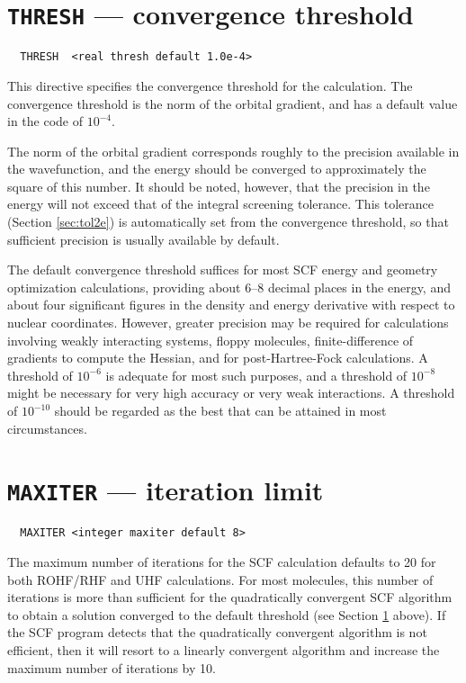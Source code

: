 \section{{\tt THRESH} --- convergence threshold}
\label{sec:thresh}

\begin{verbatim}
  THRESH  <real thresh default 1.0e-4>
\end{verbatim}

This directive specifies the convergence threshold for the
calculation.  The convergence threshold is the norm of the orbital
gradient, and has a default value in the code of $10^{-4}$.

The norm of the orbital gradient corresponds roughly to the precision
available in the wavefunction, and the energy should be converged to
approximately the square of this number.  It should be noted, however,
that the precision in the energy will not exceed that of the integral
screening tolerance.  This tolerance (Section \ref{sec:tol2e}) is
automatically set from the convergence threshold, so that sufficient
precision is usually available by default.

The default convergence threshold suffices for most SCF energy and
geometry optimization calculations, providing about 6--8 decimal
places in the energy, and about four significant figures in the
density and energy derivative with respect to nuclear coordinates.
However, greater precision may be required for calculations involving
weakly interacting systems, floppy molecules, finite-difference of
gradients to compute the Hessian, and for post-Hartree-Fock
calculations.  A threshold of $10^{-6}$ is adequate for most such
purposes, and a threshold of $10^{-8}$ might be necessary for very
high accuracy or very weak interactions.  A threshold of $10^{-10}$
should be regarded as the best that can be attained in most
circumstances.

\section{{\tt MAXITER} --- iteration limit}
\label{sec:max}

\begin{verbatim}
  MAXITER <integer maxiter default 8>
\end{verbatim}

\sloppy

The maximum number of iterations for the SCF calculation defaults to
20 for both ROHF/RHF and UHF calculations.  For most molecules, this
number of iterations is more than sufficient for the quadratically
convergent SCF algorithm to obtain a solution converged to the default
threshold (see Section \ref{sec:thresh} above).  If the SCF program
detects that the quad\-ratically con\-ver\-gent algorithm is not
efficient, then it will resort to a lin\-early con\-ver\-gent
algorithm and increase the maximum number of iterations by 10.

